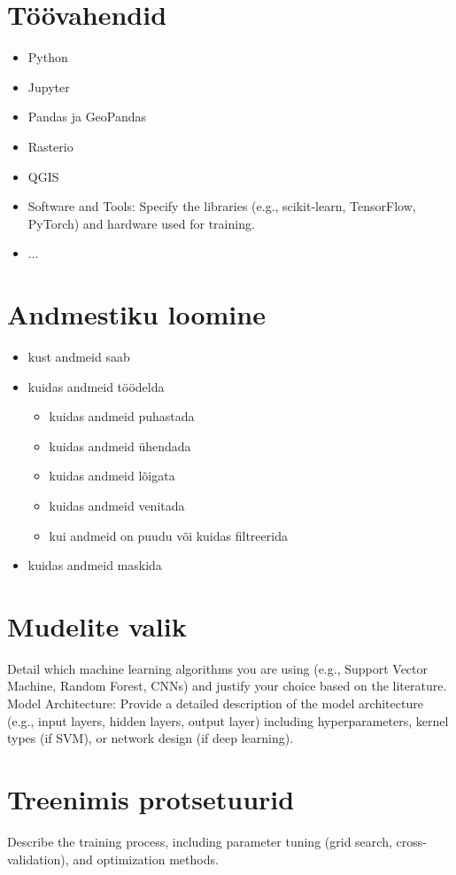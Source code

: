\section{Töövahendid}
\begin{itemize}
    \item Python
    \item Jupyter
    \item Pandas ja GeoPandas
    \item Rasterio
    \item QGIS
    \item Software and Tools: Specify the libraries (e.g., scikit-learn, TensorFlow, PyTorch) and hardware used for training.
    \item ...
\end{itemize}

\section{Andmestiku loomine}
\begin{itemize}
    \item kust andmeid saab

    \item kuidas andmeid töödelda
    \begin{itemize}
        \item kuidas andmeid puhastada
        \item kuidas andmeid ühendada
        \item kuidas andmeid lõigata
        \item kuidas andmeid venitada
        \item kui andmeid on puudu või kuidas filtreerida
    \end{itemize}

    
\item kuidas andmeid maskida

\end{itemize}

\section{Mudelite valik}
Detail which machine learning algorithms you are using (e.g., Support Vector Machine, Random Forest, CNNs) and justify your choice based on the literature.
Model Architecture: Provide a detailed description of the model architecture (e.g., input layers, hidden layers, output layer) including hyperparameters, kernel types (if SVM), or network design (if deep learning).
\section{Treenimis protsetuurid}
Describe the training process, including parameter tuning (grid search, cross-validation), and optimization methods.